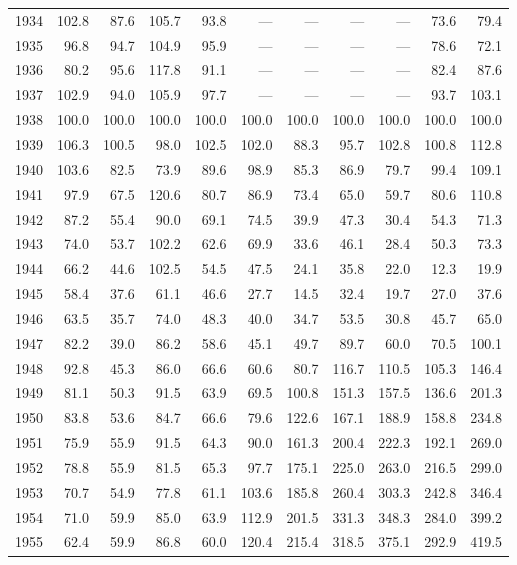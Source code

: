 \begin{longtable}{r*{10}{r}}
1934 & 102.8 & 87.6 & 105.7 & 93.8 & --- & --- & --- & --- & 73.6 & 79.4 \\
1935 & 96.8 & 94.7 & 104.9 & 95.9 & --- & --- & --- & --- & 78.6 & 72.1 \\
1936 & 80.2 & 95.6 & 117.8 & 91.1 & --- & --- & --- & --- & 82.4 & 87.6 \\
1937 & 102.9 & 94.0 & 105.9 & 97.7 & --- & --- & --- & --- & 93.7 & 103.1 \\
1938 & 100.0 & 100.0 & 100.0 & 100.0 & 100.0 & 100.0 & 100.0 & 100.0 & 100.0 & 100.0 \\
1939 & 106.3 & 100.5 & 98.0 & 102.5 & 102.0 & 88.3 & 95.7 & 102.8 & 100.8 & 112.8 \\
1940 & 103.6 & 82.5 & 73.9 & 89.6 & 98.9 & 85.3 & 86.9 & 79.7 & 99.4 & 109.1 \\
1941 & 97.9 & 67.5 & 120.6 & 80.7 & 86.9 & 73.4 & 65.0 & 59.7 & 80.6 & 110.8 \\
1942 & 87.2 & 55.4 & 90.0 & 69.1 & 74.5 & 39.9 & 47.3 & 30.4 & 54.3 & 71.3 \\
1943 & 74.0 & 53.7 & 102.2 & 62.6 & 69.9 & 33.6 & 46.1 & 28.4 & 50.3 & 73.3 \\
1944 & 66.2 & 44.6 & 102.5 & 54.5 & 47.5 & 24.1 & 35.8 & 22.0 & 12.3 & 19.9 \\
1945 & 58.4 & 37.6 & 61.1 & 46.6 & 27.7 & 14.5 & 32.4 & 19.7 & 27.0 & 37.6 \\
1946 & 63.5 & 35.7 & 74.0 & 48.3 & 40.0 & 34.7 & 53.5 & 30.8 & 45.7 & 65.0 \\
1947 & 82.2 & 39.0 & 86.2 & 58.6 & 45.1 & 49.7 & 89.7 & 60.0 & 70.5 & 100.1 \\
1948 & 92.8 & 45.3 & 86.0 & 66.6 & 60.6 & 80.7 & 116.7 & 110.5 & 105.3 & 146.4 \\
1949 & 81.1 & 50.3 & 91.5 & 63.9 & 69.5 & 100.8 & 151.3 & 157.5 & 136.6 & 201.3 \\
1950 & 83.8 & 53.6 & 84.7 & 66.6 & 79.6 & 122.6 & 167.1 & 188.9 & 158.8 & 234.8 \\
1951 & 75.9 & 55.9 & 91.5 & 64.3 & 90.0 & 161.3 & 200.4 & 222.3 & 192.1 & 269.0 \\
1952 & 78.8 & 55.9 & 81.5 & 65.3 & 97.7 & 175.1 & 225.0 & 263.0 & 216.5 & 299.0 \\
1953 & 70.7 & 54.9 & 77.8 & 61.1 & 103.6 & 185.8 & 260.4 & 303.3 & 242.8 & 346.4 \\
1954 & 71.0 & 59.9 & 85.0 & 63.9 & 112.9 & 201.5 & 331.3 & 348.3 & 284.0 & 399.2 \\
1955 & 62.4 & 59.9 & 86.8 & 60.0 & 120.4 & 215.4 & 318.5 & 375.1 & 292.9 & 419.5 \\

\end{longtable}
